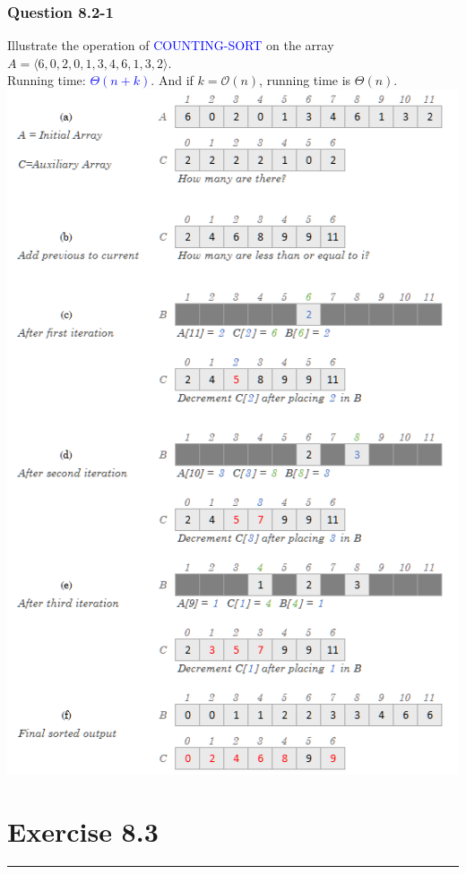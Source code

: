 \documentclass[11pt]{article}
\begin{document}
\subsubsection*{Question 8.2-1}\nointerlineskip
Illustrate the operation of \textcolor{blue}{COUNTING-SORT} on the array $A = \langle 6, 0, 2, 0, 1, 3, 4, 6, 1, 3, 2\rangle$.\\
Running time: \textcolor{blue}{$\Theta(n+k)$}. And if $k=\mathcal{O}(n)$, running time is $\Theta(n)$.\\[12pt]
\includegraphics[scale=.9]{Ques8-2-1.png}\\

\section*{Exercise 8.3}\nointerlineskip
\noindent \rule{\linewidth}{0.01pt}\\
\end{document}
